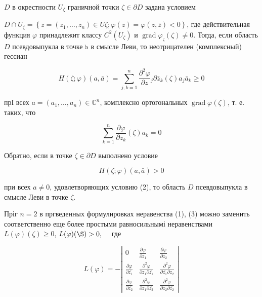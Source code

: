 \documentclass[10pt]{article}
\begin{document}
$D$ в окрестности $U_{\zeta}$ граничной точки $\zeta \in \partial D$ задана условием



$D \cap U_{\zeta}=\left\{z=\left(z_{1}, \ldots, z_{n}\right) \in U \zeta ; \varphi(z)=\varphi(z, \bar{z})<0\right\}$, где действительная функция $\varphi$ принадлежит классу $C^{2}\left(U_{\zeta}\right)$ и $\operatorname{grad} \varphi_{\varsigma}(\zeta) \neq 0$. Тогда, если область $D$ псевдовыпукла в точке ๖ в смысле Леви, то неотрицателен (комплексный) гессиан



\[

H(\zeta ; \varphi)(a, \bar{a})=\sum_{j, k=1}^{n} \frac{\partial^{2} \varphi}{\partial z}{ }_{j} \partial \bar{z}_{k}(\zeta) a_{j} \bar{a}_{k} \geqslant 0

\]



прІ всех $a=\left(a_{1}, \ldots, a_{n}\right) \in \mathbb{C}^{n}$, комплексно ортогональных $\operatorname{grad} \varphi(\zeta)$, т. е. таких, что



\[

\sum_{k=1}^{n} \frac{\partial \varphi}{\partial z_{k}}(\zeta) a_{k}=0

\]



Обратно, если в точке $\zeta \in \partial D$ выполнено условие



\[

H(\zeta ; \varphi)(a, \bar{a})>0

\]



при всех $a \neq 0$, удовлетворяющих условию (2), то область $D$ псевдовыпукла в смысле Леви в точке $\zeta$.



Пріг $n=2$ в пргведенных формулировках неравенства (1), (3) можно заменить соответственно еще более простыми равносильнымі неравенствами $L(\varphi)(\zeta) \geqslant 0$, $L(\varphi)(\S)>0, \quad$ где



\[

L(\varphi)=-\left|\begin{array}{ccc}

0 & \frac{\partial \varphi}{\partial z_{1}} & \frac{\partial \varphi}{\partial z_{2}} \\

\frac{\partial \varphi}{\partial \overline{z_{1}}} & \frac{\partial^{2} \varphi}{\partial z_{1} \partial \overline{z_{1}}} & \frac{\partial^{2} \varphi}{\partial \overline{z_{1}} \partial z_{2}} \\

\frac{\partial \varphi}{\partial \overline{z_{2}}} & \frac{\partial^{2} \varphi}{\partial z_{1} \partial \overline{z_{2}}} & \frac{\partial^{2} \varphi}{\partial z_{2} \partial \overline{z_{2}}}

\end{array}\right|

\]
\end{document}
